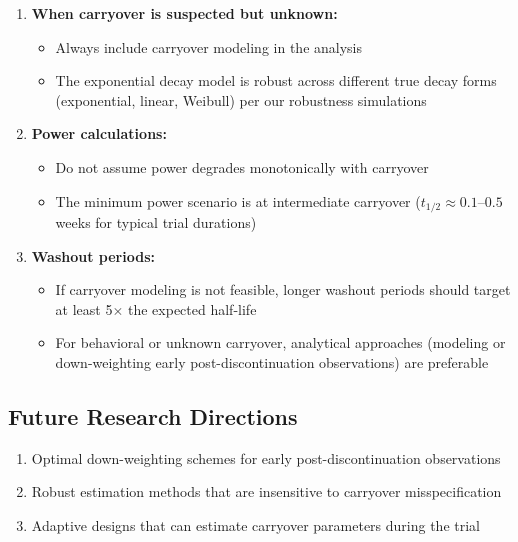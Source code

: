 \documentclass[11pt,a4paper]{article}
\begin{document}
\begin{enumerate}
    \item \textbf{When carryover is suspected but unknown:}
    \begin{itemize}
        \item Always include carryover modeling in the analysis
        \item The exponential decay model is robust across different true decay forms
              (exponential, linear, Weibull) per our robustness simulations
    \end{itemize}

    \item \textbf{Power calculations:}
    \begin{itemize}
        \item Do not assume power degrades monotonically with carryover
        \item The minimum power scenario is at intermediate carryover ($t_{1/2} \approx 0.1$--$0.5$
              weeks for typical trial durations)
    \end{itemize}

    \item \textbf{Washout periods:}
    \begin{itemize}
        \item If carryover modeling is not feasible, longer washout periods should
              target at least 5$\times$ the expected half-life
        \item For behavioral or unknown carryover, analytical approaches (modeling or
              down-weighting early post-discontinuation observations) are preferable
    \end{itemize}
\end{enumerate}

\subsection{Future Research Directions}

\begin{enumerate}
    \item Optimal down-weighting schemes for early post-discontinuation observations
    \item Robust estimation methods that are insensitive to carryover misspecification
    \item Adaptive designs that can estimate carryover parameters during the trial
\end{enumerate}
\end{document}
